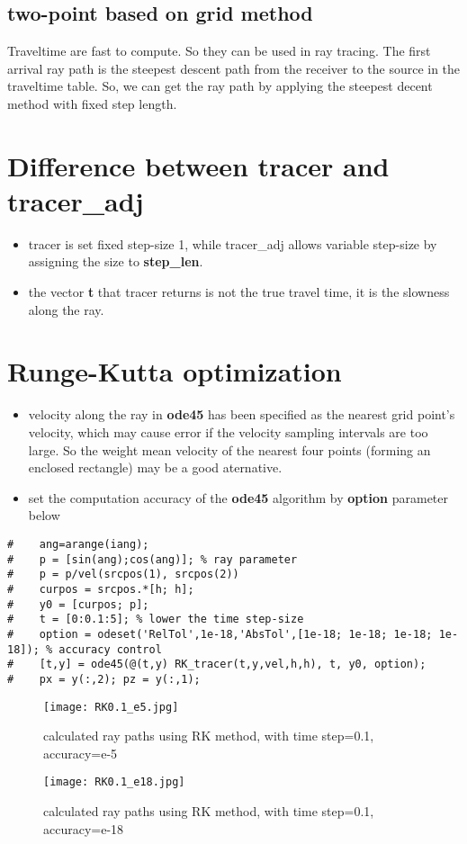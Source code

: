 \documentclass{article}
\begin{document}
\subsection{two-point based on grid method}
Traveltime are fast to compute. So they can be used in ray tracing. The
first arrival ray path is the steepest descent path from the receiver to
the source in the traveltime table. So, we can get the ray path by
applying the steepest decent method with fixed step length.

\section{Difference between tracer and tracer\_adj}
\begin{itemize}
  \item tracer is set fixed step-size 1, while tracer\_adj allows variable step-size by assigning the size to \textbf{step\_len}.
  \item the vector \textbf{t} that tracer returns is not the true travel time, it is the slowness along the ray.
\end{itemize}

\section{Runge-Kutta optimization}
\begin{itemize}
\item velocity along the ray in \textbf{ode45} has been specified as the nearest grid point's velocity, which may cause error if the velocity sampling intervals are too large. So the weight mean velocity of the nearest four points (forming an enclosed rectangle) may be a good aternative.
\item set the computation accuracy of the \textbf{ode45} algorithm by \textbf{option} parameter below
\end{itemize}
\begin{lstlisting}
#    ang=arange(iang);
#    p = [sin(ang);cos(ang)]; % ray parameter
#    p = p/vel(srcpos(1), srcpos(2))
#    curpos = srcpos.*[h; h];
#    y0 = [curpos; p];
#    t = [0:0.1:5]; % lower the time step-size
#    option = odeset('RelTol',1e-18,'AbsTol',[1e-18; 1e-18; 1e-18; 1e-18]); % accuracy control
#    [t,y] = ode45(@(t,y) RK_tracer(t,y,vel,h,h), t, y0, option);
#    px = y(:,2); pz = y(:,1);
\end{lstlisting}
\begin{figure}[H]
\centering
\texttt{[image: RK0.1\_e5.jpg]}
\caption{calculated ray paths using RK method, with time step=0.1, accuracy=e-5}
\end{figure}
\begin{figure}[H]
\centering
\texttt{[image: RK0.1\_e18.jpg]}
\caption{calculated ray paths using RK method, with time step=0.1, accuracy=e-18}
\end{figure}
\end{document}
